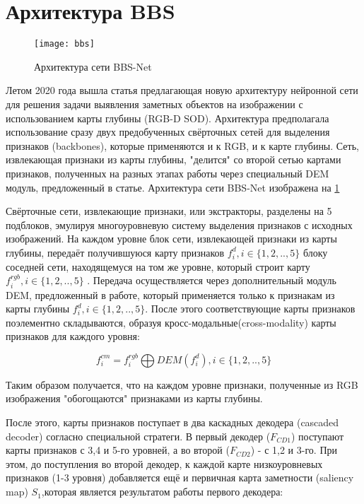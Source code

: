 \section{Архитектура BBS}

\begin{figure}[h]
    \centering
    \texttt{[image: bbs]}
    \caption{Архитектура сети BBS-Net}
    \label{fig:bbs}
\end{figure}

Летом 2020 года вышла статья \cite{BBS} предлагающая новую архитектуру нейронной сети для решения задачи выявления заметных объектов на изображении 
с использованием карты глубины (RGB-D SOD). Архитектура предполагала использование сразу двух предобученных свёрточных сетей
для выделения признаков (backbones), которые применяются и к RGB, и к карте глубины. Сеть, извлекающая признаки
из карты глубины, "делится" со второй сетью картами признаков, полученных на разных этапах работы через специальный DEM модуль, 
предложенный в статье. Архитектура сети BBS-Net изображена на \ref{fig:bbs}


Свёрточные сети, извлекающие признаки, или экстракторы, разделены на 5 подблоков, эмулируя многоуровневую систему выделения признаков с исходных изображений.
На каждом уровне блок сети, извлекающей признаки из карты глубины, передаёт получившуюся карту признаков $f_i^d, i \in \{1,2,..,5\}$ блоку соседней сети, 
находящемуся на том же уровне, который строит карту $f_i^{rgb}, i \in \{1,2,..,5\}$ . Передача осуществляется через дополнительный модуль DEM, предложенный в работе,
который применяется только к признакам из карты глубины $f_i^d, i \in \{1,2,..,5\}$. 
После этого соответствующие карты признаков поэлементно складываются, образуя кросс-модальные(cross-modality) карты признаков для каждого уровня:

\begin{equation}
    f_i^{cm} = f_i^{rgb} \bigoplus DEM(f_i^{d}), i \in \{1,2,..,5\}
    \label{eq:DEM}
\end{equation}

Таким образом получается, что на каждом уровне признаки, полученные из RGB изображения "обогощаются" признаками из карты глубины.

После этого, карты признаков поступает в два каскадных декодера (cascaded decoder) согласно специальной стратеги. В первый декодер ($F_{CD1}$)
поступают карты признаков с 3,4 и 5-го уровней, а во второй  ($F_{CD2}$) - с 1,2 и 3-го. При этом, до поступления во второй декодер, к каждой карте низкоуровневых 
признаков (1-3 уровня) добавляется ещё и первичная карта заметности (saliency map) $S_1$,которая является результатом работы первого декодера:

